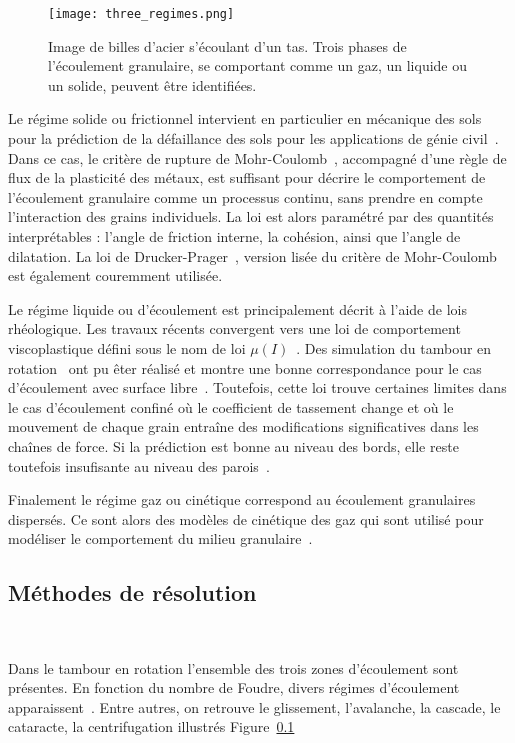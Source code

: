 \begin{figure}
    \texttt{[image: three\_regimes.png]}
    \caption{Image de billes d'acier s'écoulant d'un tas. Trois phases de l'écoulement granulaire, se comportant comme un gaz, un liquide ou un solide, peuvent être identifiées.~\cite{forterre_flows_2008}}
\end{figure}

Le régime solide ou frictionnel intervient en particulier en mécanique des sols pour la prédiction de la défaillance des sols pour les applications de génie civil~\cite{Campbell2006}. Dans ce cas, le critère de rupture de Mohr-Coulomb~\cite{Juvinal1991}, accompagné d'une règle de flux de la plasticité des métaux, est suffisant pour décrire le comportement de l'écoulement granulaire comme un processus continu, sans prendre en compte l'interaction des grains individuels. La loi est alors paramétré par des quantités interprétables : l'angle de friction interne, la cohésion, ainsi que l'angle de dilatation. La loi de Drucker-Prager~\cite{Drucker1952}, version lisée du critère de Mohr-Coulomb est également couremment utilisée.


Le régime liquide ou d'écoulement est principalement décrit à l'aide de lois rhéologique. Les travaux récents convergent vers une loi de comportement viscoplastique défini sous le nom de loi $\mu(I)$~\cite{gdr_midi_dense_2004,jop_constitutive_2006}. Des simulation du tambour en rotation~\cite{Cortet_2009} ont pu êter réalisé et montre une bonne correspondance pour le cas d'écoulement avec surface libre~\cite{chou_cross-sectional_2009}. Toutefois, cette loi trouve certaines limites dans le cas d'écoulement confiné où le coefficient de tassement change et où le mouvement de chaque grain entraîne des modifications significatives dans les chaînes de force. Si la prédiction est bonne au niveau des bords, elle reste toutefois insufisante au niveau des parois~\cite{Rognon_Miller_Metzger_Einav_2015}.

Finalement le régime gaz ou cinétique correspond au écoulement granulaires dispersés. Ce sont alors des modèles de cinétique des gaz qui sont utilisé pour modéliser le comportement du milieu granulaire~\cite{Ng2008}.

\subsection{Méthodes de résolution}~\label{sec:methode_resolution}

Dans le tambour en rotation l'ensemble des trois zones d'écoulement sont présentes. En fonction du nombre de Foudre, divers régimes d'écoulement apparaissent~\cite{MELLMANN2001251}. Entre autres, on retrouve le glissement, l'avalanche, la cascade, le cataracte, la centrifugation illustrés Figure~\ref{}

